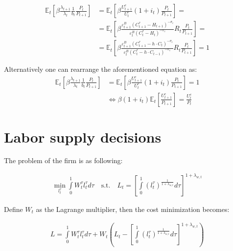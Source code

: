 \documentclass{pracamgr}
\numberwithin{equation}{section}
\begin{document}
\begin{align}
\mathbb{E}_{t} \left[ \beta \frac{\lambda_{t+1}}{\lambda_{t}} \frac{1}{b_{t}}\frac{P_{t}}{P_{t+1}} \right] &= \mathbb{E}_{t} \left[ \beta \frac{U^{c}_{t+1}}{U^{c}_{t}} (1 + i_{t}) \frac{P_{t}}{P_{t+1}} \right] = \nonumber \\
&= \mathbb{E}_{t} \left[ \beta \frac{\varepsilon_{t+1}^{B} (C_{t+1}^{\tau} - H_{t+1} )^{-\sigma_{c}}}{\varepsilon_{t}^{B} (C_{t}^{\tau} - H_{t} )^{-\sigma_{c}}} R_{t} \frac{P_{t}}{P_{t+1}} \right] = \nonumber \\
&= \mathbb{E}_{t} \left[ \beta \frac{\varepsilon_{t+1}^{B} (C_{t+1}^{\tau} - h \cdot C_{t} )^{-\sigma_{c}}}{\varepsilon_{t}^{B} (C_{t}^{\tau} - h \cdot C_{t-1} )^{-\sigma_{c}}} R_{t} \frac{P_{t}}{P_{t+1}} \right] = 1
\end{align}

Alternatively one can rearrange the aforementioned equation as:
\begin{align}
\mathbb{E}_{t} \left[ \beta \frac{\lambda_{t+1}}{\lambda_{t}} \frac{1}{b_{t}}\frac{P_{t}}{P_{t+1}} \right] &= \mathbb{E}_{t} \left[ \beta \frac{U^{c}_{t+1}}{U^{c}_{t}} (1 + i_{t}) \frac{P_{t}}{P_{t+1}} \right] = 1 \nonumber \\
& \iff \beta (1 + i_{t}) \mathbb{E}_{t} \left[ \frac{U_{t+1}^{c}}{P_{t+1}} \right] = \frac{U_{t}^{c}}{P_{t}}
\end{align}

\section*{Labor supply decisions}

The problem of the firm is as following:

\begin{align}
\min_{l_{t}^{\tau}} \int\limits_{0}^{1} W_{t}^{\tau} l_{t}^{\tau} d\tau \quad \text{s.t.} \quad L_{t} = \left[ \int\limits_{0}^{1} \left( l_{t}^{\tau} \right)^{\frac{1}{1+\lambda_{w,t}}} d\tau \right]^{1+\lambda_{w,t}}
\end{align}

Define $W_{t}$ as the Lagrange multiplier, then the cost minimization becomes:

\begin{align}
L = \int\limits_{0}^{1} W_{t}^{\tau} l_{t}^{\tau} d\tau + W_{t} \left( L_{t} - \left[ \int\limits_{0}^{1} \left( l_{t}^{\tau} \right)^{\frac{1}{1+\lambda_{w,t}}} d\tau \right]^{1+\lambda_{w,t}} \right)
\end{align}
\end{document}
